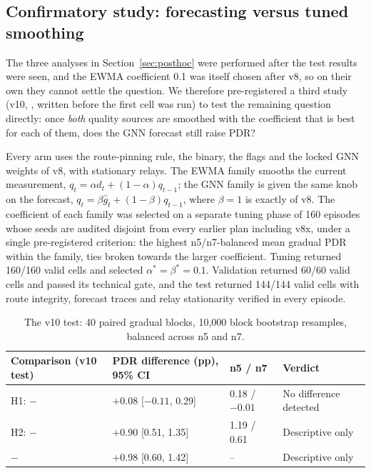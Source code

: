 \subsection{Confirmatory study: forecasting versus tuned smoothing}\label{sec:v10}
The three analyses in Section~\ref{sec:posthoc} were performed after the test
results were seen, and the EWMA coefficient 0.1 was itself chosen after v8, so
on their own they cannot settle the question. We therefore pre-registered a
third study (v10, , written before the first
cell was run) to test the remaining question directly: once \emph{both} quality
sources are smoothed with the coefficient that is best for each of them, does
the GNN forecast still raise PDR?

Every arm uses the route-pinning rule, the binary, the flags and the locked GNN
weights of v8, with stationary relays. The EWMA family smooths the current
measurement, $q_t=\alpha d_t+(1-\alpha)q_{t-1}$; the GNN family is given the
same knob on the forecast, $q_t=\beta\hat g_t+(1-\beta)q_{t-1}$, where
$\beta=1$ is exactly  of v8. The coefficient of each family was
selected on a separate tuning phase of 160 episodes whose seeds are audited
disjoint from every earlier plan including v8x, under a single pre-registered
criterion: the highest n5/n7-balanced mean gradual PDR within the family, ties
broken towards the larger coefficient. Tuning returned 160/160 valid cells and
selected $\alpha^\ast=\beta^\ast=0.1$. Validation returned 60/60 valid cells and
passed its technical gate, and the test returned 144/144 valid cells with route
integrity, forecast traces and relay stationarity verified in every episode.

\begin{table}[htbp]
\centering\small
\begin{tabularx}{\linewidth}{@{}Yp{3.4cm}p{1.9cm}p{2.4cm}@{}}
\toprule
\textbf{Comparison (v10 test)}&\textbf{PDR difference (pp), 95\% CI}&\textbf{n5 / n7}&\textbf{Verdict}\\\midrule
H1:  $-$ &$+0.08$ [$-0.11$, 0.29]&0.18 / $-0.01$&No difference detected\\
H2:  $-$ &$+0.90$ [0.51, 1.35]&1.19 / 0.61&Descriptive only\\
 $-$ &$+0.98$ [0.60, 1.42]&--&Descriptive only\\
\bottomrule
\end{tabularx}
\caption{The v10 test: 40 paired gradual blocks, 10{,}000 block bootstrap resamples, balanced across n5 and n7.}\label{tab:v10test}
\end{table}

